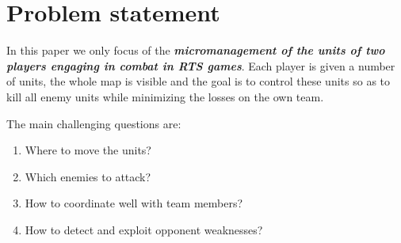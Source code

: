 \section{Problem statement}
In this paper we only focus of the \textbf{\textit{micromanagement of the units of two players engaging in combat in RTS games}}.
Each player is given a number of units, the whole map is visible and the goal is to control these units so as to kill all enemy units while minimizing the losses on the own team.

The main challenging questions are:
\begin{enumerate}
        \setlength{\topsep}{0pt}
        \setlength{\partopsep}{0pt}
        \setlength{\itemsep}{0pt}
        \setlength{\parskip}{0pt}
        \setlength{\parsep}{0pt}
    \item Where to move the units?
    \item Which enemies to attack?
    \item How to coordinate well with team members?
    \item How to detect and exploit opponent weaknesses?
\end{enumerate}
